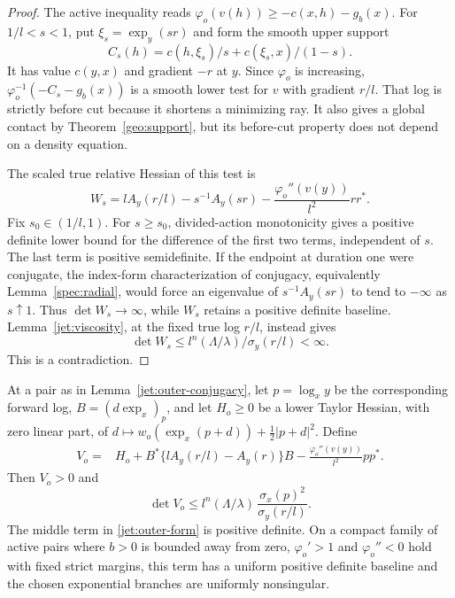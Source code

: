 \begin{proof}
The active inequality reads
$\varphi_o(v(h))\ge-c(x,h)-g_b(x)$.
For $1/l<s<1$, put $\xi_s=\exp_y(sr)$ and form the smooth upper
support
\[
 C_s(h)=c(h,\xi_s)/s+c(\xi_s,x)/(1-s).
\]
It has value $c(y,x)$ and gradient $-r$ at $y$. Since
$\varphi_o$ is increasing, $\varphi_o^{-1}(-C_s-g_b(x))$
is a smooth lower test for $v$ with gradient $r/l$.
That log is strictly before cut because it shortens a minimizing
ray. It also gives a global contact by
Theorem~\ref{geo:support}, but its before-cut property does not
depend on a density equation.

The scaled true relative Hessian of this test is
\begin{equation}\label{jet:outer-truncated}
 W_s=lA_y(r/l)-s^{-1}A_y(sr)
       -\frac{\varphi_o''(v(y))}{l^2}rr^*.
\end{equation}
Fix $s_0\in(1/l,1)$. For $s\ge s_0$, divided-action monotonicity
gives a positive definite lower bound for the difference of the
first two terms, independent of $s$. The last term is positive
semidefinite. If the endpoint at duration one were conjugate,
the index-form characterization of conjugacy, equivalently
Lemma~\ref{spec:radial}, would force an eigenvalue of
$s^{-1}A_y(sr)$ to tend to $-\infty$ as $s\uparrow1$.
Thus $\det W_s\to\infty$, while $W_s$ retains a positive
definite baseline. Lemma~\ref{jet:viscosity}, at the fixed true
log $r/l$, instead gives
\[
 \det W_s\le l^n(\Lambda/\lambda)/\sigma_y(r/l)<\infty.
\]
This is a contradiction.
\end{proof}

\begin{lemma}
\label{jet:outer-test}
At a pair as in Lemma~\ref{jet:outer-conjugacy}, let
$p=\log_xy$ be the corresponding forward log,
$B=(d\exp_x)_p$, and let $H_o\ge0$ be a lower Taylor Hessian,
with zero linear part, of
$d\mapsto w_o(\exp_x(p+d))+\tfrac12|p+d|^2$.
Define
\begin{align}
 V_o={}&H_o+B^*\{lA_y(r/l)-A_y(r)\}B
             -\frac{\varphi_o''(v(y))}{l^2}pp^* .
 \label{jet:outer-form}
\end{align}
Then $V_o>0$ and
\begin{equation}\label{jet:outer-det}
 \det V_o\le
 l^n(\Lambda/\lambda)\,
       \frac{\sigma_x(p)^2}{\sigma_y(r/l)}.
\end{equation}
The middle term in \eqref{jet:outer-form} is positive definite.
On a compact family of active pairs where $b>0$ is bounded away
from zero, $\varphi_o'>1$ and $\varphi_o''<0$ hold with fixed
strict margins, this term has a uniform positive definite
baseline and the chosen exponential branches are uniformly
nonsingular.
\end{lemma}

